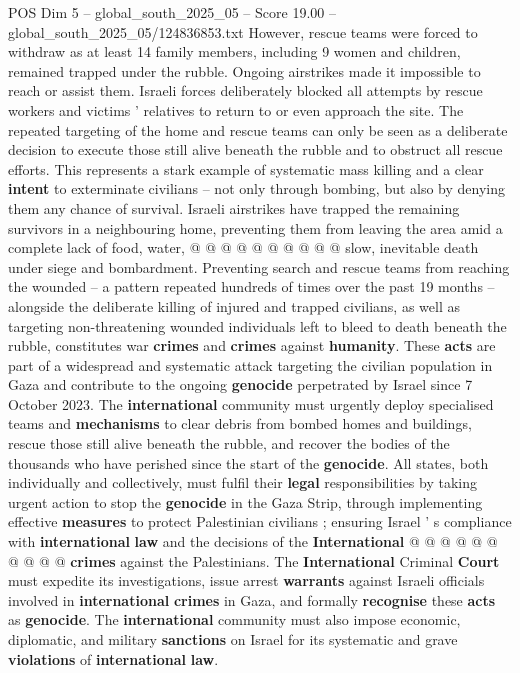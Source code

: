 \begin{textsample}{POS Dim 5 – global\_south\_2025\_05 – Score 19.00 – global\_south\_2025\_05/124836853.txt}
However, rescue teams were forced to withdraw as at least 14 family members, including 9 women and children, remained trapped under the rubble.
Ongoing airstrikes made it impossible to reach or assist them.
Israeli forces deliberately blocked all attempts by rescue workers and victims ' relatives to return to or even approach the site.
The repeated targeting of the home and rescue teams can only be seen as a deliberate decision to execute those still alive beneath the rubble and to obstruct all rescue efforts.
This represents a stark example of systematic mass killing and a clear \textbf{intent} to exterminate civilians -- not only through bombing, but also by denying them any chance of survival.
Israeli airstrikes have trapped the remaining survivors in a neighbouring home, preventing them from leaving the area amid a complete lack of food, water, @ @ @ @ @ @ @ @ @ @ slow, inevitable death under siege and bombardment.
Preventing search and rescue teams from reaching the wounded -- a pattern repeated hundreds of times over the past 19 months -- alongside the deliberate killing of injured and trapped civilians, as well as targeting non-threatening wounded individuals left to bleed to death beneath the rubble, constitutes war \textbf{crimes} and \textbf{crimes} against \textbf{humanity}.
These \textbf{acts} are part of a widespread and systematic attack targeting the civilian population in Gaza and contribute to the ongoing \textbf{genocide} perpetrated by Israel since 7 October 2023.
The \textbf{international} community must urgently deploy specialised teams and \textbf{mechanisms} to clear debris from bombed homes and buildings, rescue those still alive beneath the rubble, and recover the bodies of the thousands who have perished since the start of the \textbf{genocide}.
All states, both individually and collectively, must fulfil their \textbf{legal} responsibilities by taking urgent action to stop the \textbf{genocide} in the Gaza Strip, through implementing effective \textbf{measures} to protect Palestinian civilians ; ensuring Israel ' s compliance with \textbf{international} \textbf{law} and the decisions of the \textbf{International} @ @ @ @ @ @ @ @ @ @ \textbf{crimes} against the Palestinians.
The \textbf{International} Criminal \textbf{Court} must expedite its investigations, issue arrest \textbf{warrants} against Israeli officials involved in \textbf{international} \textbf{crimes} in Gaza, and formally \textbf{recognise} these \textbf{acts} as \textbf{genocide}.
The \textbf{international} community must also impose economic, diplomatic, and military \textbf{sanctions} on Israel for its systematic and grave \textbf{violations} of \textbf{international} \textbf{law}.

\end{textsample}
